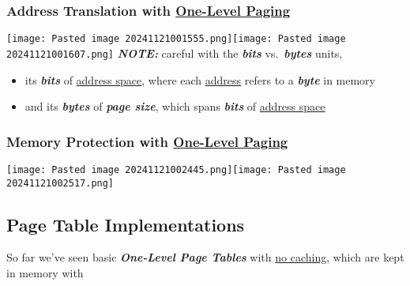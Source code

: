 \subsubsection*{\texorpdfstring{Address Translation with \ul{One-Level
Paging}}{Address Translation with One-Level Paging}}

\texttt{[image: Pasted image 20241121001555.png]}\texttt{[image: Pasted image 20241121001607.png]}
\textbf{\textit{NOTE:}} careful with the \textbf{\textit{bits}}
vs.~\textbf{\textit{bytes}} units,

\begin{itemize}
\tightlist
\item
  its  \textbf{\textit{bits}} of \ul{address
  space}, where each \ul{address} refers to a \textbf{\textit{byte}} in
  memory
\item
  and its  \textbf{\textit{bytes}} of \textbf{\textit{page
  size}}, which spans  \textbf{\textit{bits}} of \ul{address
  space}
\end{itemize}

\subsubsection*{\texorpdfstring{Memory Protection with \ul{One-Level
Paging}}{Memory Protection with One-Level Paging}}

\texttt{[image: Pasted image 20241121002445.png]}\texttt{[image: Pasted image 20241121002517.png]}

\subsection*{Page Table Implementations}

So far we've seen basic \textbf{\textit{One-Level Page Tables}} with
\ul{no caching}, which are kept in memory with

